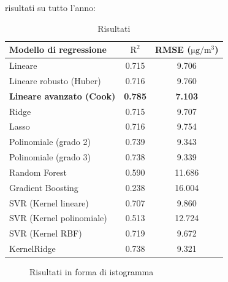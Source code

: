 risultati su tutto l’anno:
\begin{table}[H]
    \footnotesize
    \centering
    \begin{tabular}{|l|c|c|}
    \hline
        \textbf{Modello di regressione} & $\bm{\mathrm{R^2}}$ & \textbf{RMSE (}$\mathrm{\si{\micro}g/m^3}$) \\ \hline
        Lineare & 0.715 & 9.706 \\ \hline
        Lineare robusto (Huber) & 0.716 & 9.760 \\ \hline
        \textbf{Lineare avanzato (Cook)} & \textbf{0.785} & \textbf{7.103} \\ \hline
        Ridge & 0.715 & 9.707 \\ \hline
        Lasso & 0.716 & 9.754 \\ \hline
        Polinomiale (grado 2) & 0.739 & 9.343 \\ \hline
        Polinomiale (grado 3) & 0.738 & 9.339 \\ \hline
        Random Forest & 0.590 & 11.686 \\ \hline
        Gradient Boosting & 0.238 & 16.004 \\ \hline
        SVR (Kernel lineare) & 0.707 & 9.860 \\ \hline
        SVR (Kernel polinomiale) & 0.513 & 12.724 \\ \hline
        SVR (Kernel RBF) & 0.719 & 9.672 \\ \hline
        KernelRidge & 0.738 & 9.321 \\ \hline
    \end{tabular}
    \caption{Risultati}
    \label{fig:risultati-pm10}
\end{table}

\begin{figure}[H]%
    \centering
    \captionsetup{justification=centering}
    \caption{Risultati in forma di istogramma}%
    \label{fig:risultati-pm10-hist}%
\end{figure}

